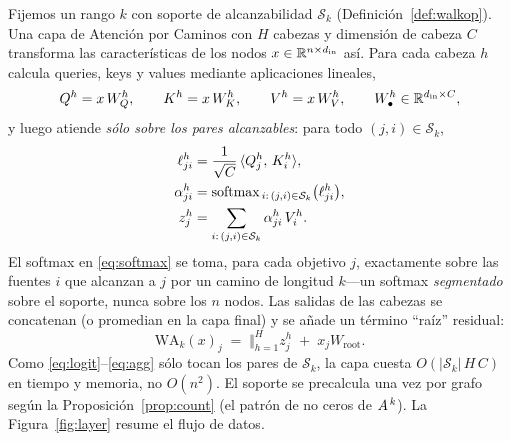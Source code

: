 Fijemos un rango $k$ con soporte de alcanzabilidad $\mathcal{S}_k$
(Definición~\ref{def:walkop}). Una capa de Atención por Caminos con $H$ cabezas y dimensión
de cabeza $C$ transforma las características de los nodos $x\in\mathbb{R}^{n\times d_{\text{in}}}$
así. Para cada cabeza $h$ calcula queries, keys y values mediante aplicaciones
lineales,
\[
  Q^h = x\,W^h_Q,\qquad K^h = x\,W^h_K,\qquad V^h = x\,W^h_V,
  \qquad W^h_\bullet\in\mathbb{R}^{d_{\text{in}}\times C},
\]
y luego atiende \emph{sólo sobre los pares alcanzables}: para todo
$(j,i)\in\mathcal{S}_k$,
\begin{align}
  \ell^h_{ji} &= \frac{1}{\sqrt{C}}\,\langle Q^h_j,\,K^h_i\rangle, \label{eq:logit}\\
  \alpha^h_{ji} &= \operatorname{softmax}_{\,i:\,(j,i)\in\mathcal{S}_k}\bigl(\ell^h_{ji}\bigr),
    \label{eq:softmax}\\
  z^h_j &= \sum_{i:\,(j,i)\in\mathcal{S}_k}\alpha^h_{ji}\,V^h_i. \label{eq:agg}
\end{align}
El softmax en \eqref{eq:softmax} se toma, para cada objetivo $j$, exactamente sobre las
fuentes $i$ que alcanzan a $j$ por un camino de longitud $k$---un softmax
\emph{segmentado} sobre el soporte, nunca sobre los $n$ nodos. Las salidas de las cabezas se
concatenan (o promedian en la capa final) y se añade un término ``raíz'' residual:
\[
  \mathrm{WA}_k(x)_j \;=\; \bigl\Vert_{h=1}^{H} z^h_j \;+\; x_j W_{\!\text{root}}.
\]
Como \eqref{eq:logit}--\eqref{eq:agg} sólo tocan los pares de
$\mathcal{S}_k$, la capa cuesta $O(|\mathcal{S}_k|\,H\,C)$ en tiempo y memoria, no
$O(n^2)$. El soporte se precalcula una vez por grafo según la
Proposición~\ref{prop:count} (el patrón de no ceros de $A^{\,k}$).
La Figura~\ref{fig:layer} resume el flujo de datos.

